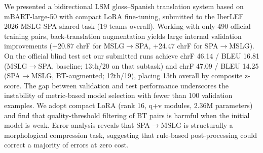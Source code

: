 \documentclass[sigconf,screen]{ceurart}
\begin{document}
We presented a bidirectional LSM gloss--Spanish translation system
based on mBART-large-50 with compact LoRA fine-tuning, submitted to
the IberLEF 2026 MSLG-SPA shared task (19 teams overall).
Working with only 490 official training pairs, back-translation
augmentation yields large internal validation improvements
(+20.87 chrF for MSLG$\!\to\!$SPA, +24.47 chrF for SPA$\!\to\!$MSLG).
On the official blind test set our submitted runs achieve chrF 46.14 /
BLEU 16.81 (MSLG$\!\to\!$SPA, baseline; 13th/20 on that subtask) and
chrF 47.09 / BLEU 14.25 (SPA$\!\to\!$MSLG, BT-augmented; 12th/19),
placing 13th overall by composite z-score.
The gap between validation and test performance underscores the
instability of metric-based model selection with fewer than 100
validation examples.
We adopt compact LoRA (rank 16, q+v modules, 2.36M parameters)
and find that quality-threshold filtering of
BT pairs is harmful when the initial model is weak.
Error analysis reveals that SPA$\!\to\!$MSLG is structurally a
morphological compression task, suggesting that rule-based
post-processing could correct a majority of errors at zero cost.
\end{document}
